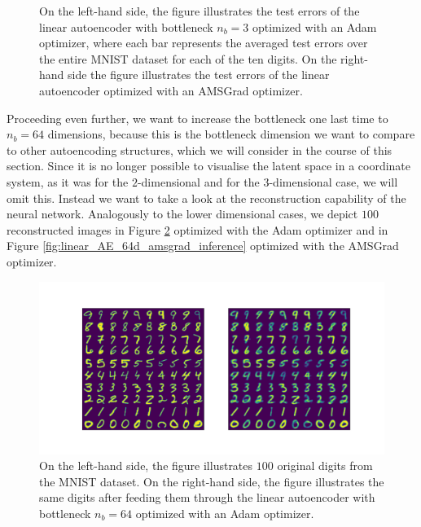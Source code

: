 \begin{figure}
\begin{center}
\begin{minipage}[b]{0.49\linewidth}
	\end{minipage}
\end{center}
\caption{On the left-hand side, the figure illustrates the test errors of the linear autoencoder with bottleneck $n_b=3$ optimized with an Adam optimizer, where each bar represents the averaged test errors over the entire MNIST dataset for each of the ten digits. On the right-hand side the figure illustrates the test errors of the linear autoencoder optimized with an AMSGrad optimizer.}\label{fig:linear_AE_3d_errors}
\end{figure}


Proceeding even further, we want to increase the bottleneck one last time to $n_b=64$ dimensions, because this is the bottleneck dimension we want to compare to other autoencoding structures, which we will consider in the course of this section. Since it is no longer possible to visualise the latent space in a coordinate system, as it was for the $2$-dimensional and for the $3$-dimensional case, we will omit this. Instead we want to take a look at the reconstruction capability of the neural network. Analogously to the lower dimensional cases, we depict $100$ reconstructed images in Figure \ref{fig:linear_AE_64d_adam_inference} optimized with the Adam optimizer and in Figure \ref{fig:linear_AE_64d_amsgrad_inference} optimized with the AMSGrad optimizer.

\begin{figure}
\begin{center}
   \begin{minipage}[b]{\linewidth}
      \includegraphics[trim = 15mm 10mm 15mm 15mm, clip, width=\linewidth]{linear_AE_64d_adam_inference}
	\end{minipage}
\end{center}
\caption{On the left-hand side, the figure illustrates $100$ original digits from the MNIST dataset. On the right-hand side, the figure illustrates the same digits after feeding them through the linear autoencoder with bottleneck $n_b=64$ optimized with an Adam optimizer.}\label{fig:linear_AE_64d_adam_inference}
\end{figure}


